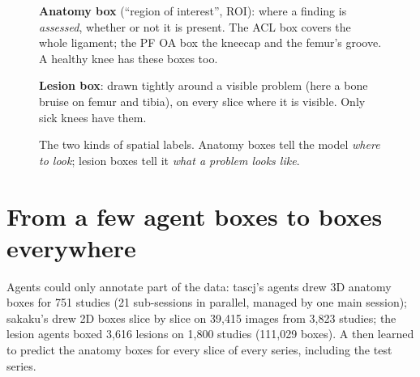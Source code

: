 \begin{figure}[H]
\centering
{}\hspace{6mm}
\begin{minipage}[b]{0.48\linewidth}\small
\textcolor{us}{\textbf{Anatomy box}} (``region of interest'', ROI): where a finding is \emph{assessed}, whether or not
it is present. The ACL box covers the whole ligament; the PF OA box the kneecap and the femur's groove. A healthy knee
has these boxes too.\par\medskip
\textcolor{them}{\textbf{Lesion box}}: drawn tightly around a visible problem (here a bone bruise on femur and tibia),
on every slice where it is visible. Only sick knees have them.\par\bigskip
\end{minipage}
\caption{The two kinds of spatial labels. Anatomy boxes tell the model \emph{where to look}; lesion boxes tell it
\emph{what a problem looks like}.}
\label{fig:boxes}
\end{figure}

\section{From a few agent boxes to boxes everywhere}

Agents could only annotate part of the data: tascj's agents drew 3D anatomy boxes for 751 studies (21 sub-sessions in
parallel, managed by one main session); sakaku's drew 2D boxes slice by slice on 39,415 images from 3,823 studies; the
lesion agents boxed 3,616 lesions on 1,800 studies (111,029 boxes). A  then learned to predict the
anatomy boxes for every slice of every series, including the test series.

